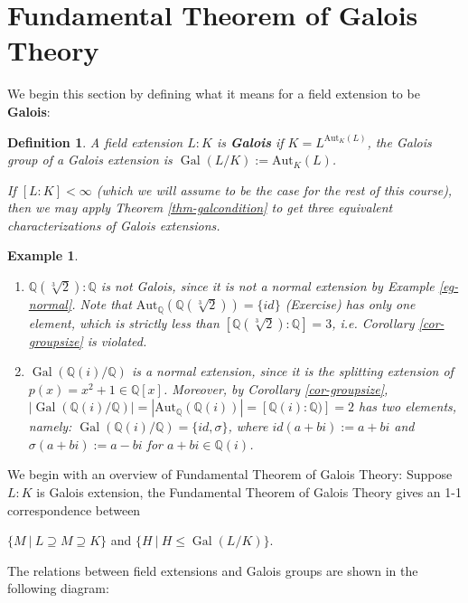 \documentclass[11pt]{book}
\newtheorem{definition}[theorem]{Definition}
\newtheorem{example}[theorem]{Example}
\begin{document}
\section{Fundamental Theorem of Galois Theory}
We begin this section by defining what it means for a field extension to be {\bf Galois}:
\begin{definition}
    A field extension $L:K$ is {\bf Galois} if $K=L^{\mathrm{Aut}_K(L)}$, the Galois group of a Galois extension is $\operatorname{Gal}(L/K):=\mathrm{Aut}_K(L)$.

    If $[L:K] < \infty$ (which we will assume to be the case for the rest of this course), then we may apply Theorem \ref{thm-galcondition} to get three equivalent characterizations of Galois extensions.
\end{definition}
\begin{example}
    \begin{enumerate}
        \item $\mathbb{Q}(\sqrt[3]{2}):\mathbb{Q}$ is not Galois, since it is not a normal extension by Example \ref{eg-normal}. Note that $\mathrm{Aut}_{\mathbb{Q}}(\mathbb{Q}(\sqrt[3]{2})) = \{id\}$ (Exercise) has only one element, which is strictly less than  $[\mathbb{Q}(\sqrt[3]{2}):\mathbb{Q}] = 3$, i.e. Corollary \ref{cor-groupsize} is violated.
        \item  $\operatorname{Gal}(\mathbb{Q}(i)/\mathbb{Q})$ is a normal extension, since it is the splitting extension of $p(x) = x^2+1 \in \mathbb{Q}[x]$. Moreover, by Corollary \ref{cor-groupsize}, $|\operatorname{Gal}(\mathbb{Q}(i)/\mathbb{Q})| = |\mathrm{Aut}_{\mathbb{Q}}(\mathbb{Q}(i))| = [\mathbb{Q}(i):\mathbb{Q})] = 2$ has two elements, namely:
        $\operatorname{Gal}(\mathbb{Q}(i)/\mathbb{Q}) = \{id, \sigma\}$, where $id(a+bi):=a+bi$ and $\sigma(a+bi):=a-bi$ for $a+bi \in \mathbb{Q}(i)$.
    \end{enumerate}
\end{example}

We begin with an overview of Fundamental Theorem of Galois Theory: 
Suppose $L : K$ is Galois extension, the Fundamental Theorem of Galois Theory gives an 1-1 correspondence between 
\begin{center}
    $\{M\ |\ L \supseteq M \supseteq K\}$ and $\{H\ |\ H\leq \operatorname{Gal}(L /K)\}$. 
\end{center}
The relations between field extensions and Galois groups are shown in the following diagram: 
\end{document}
